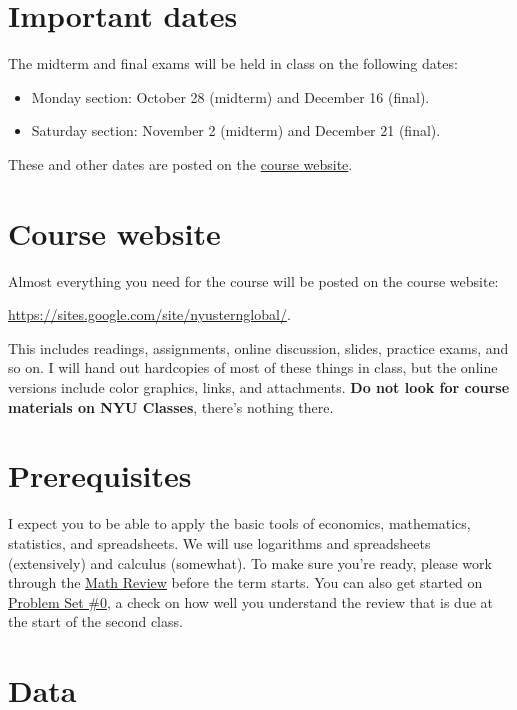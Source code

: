 \documentclass[12pt]{article}
\begin{document}
\section{Important dates}

The midterm and final exams will be held in class on the following dates:
%
\begin{itemize}
\item Monday section:  October 28 (midterm) and December 16 (final).
\item Saturday section:  November 2 (midterm) and December 21 (final).
\end{itemize}
These and other dates are posted on the
\href{https://sites.google.com/site/nyusternglobal/home/outline}{course website}.


\section{Course website}

Almost everything you need for the course will be posted on the course website:

\vspace*{\parskip}
\centerline{\url{https://sites.google.com/site/nyusternglobal/}.}

This includes readings, assignments, online discussion,
slides, practice exams, and so on.
I will hand out hardcopies of most of these things in class,
but the online versions include color graphics, links, and attachments.
{\bf Do not look for course materials on NYU Classes},
there's nothing there.


\section{Prerequisites}

I expect you to be able to apply the basic tools of economics,
mathematics, statistics, and spreadsheets.  We will use
logarithms and spreadsheets (extensively) and calculus (somewhat).
To make sure you're ready,
please work through the
\href{http://www.stern.nyu.edu/~dbackus/2303/notes_math.pdf}{Math Review}
before the term starts.
You can also get started on
\href{http://www.stern.nyu.edu/~dbackus/2303/ps0_s13.pdf}{Problem Set \#0},
a check on how well you understand the review
that is due at the start of the second class.

\section{Data}
\end{document}

